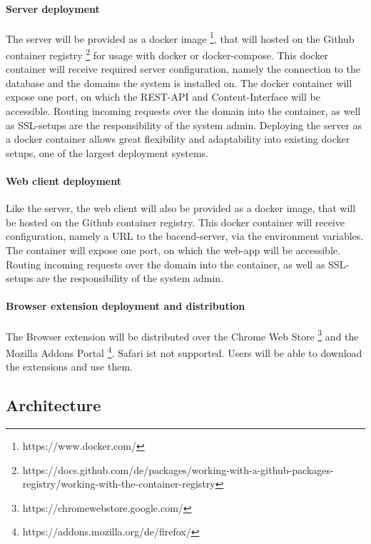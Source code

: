 \paragraph{Server deployment}
The server will be provided as a docker image \footnote{https://www.docker.com/}, that will hosted on the Github container registry \footnote{https://docs.github.com/de/packages/working-with-a-github-packages-registry/working-with-the-container-registry} for usage with docker or docker-compose.
This docker container will receive required server configuration, namely the connection to the database and the domains the system is installed on.
The docker container will expose one port, on which the REST-API and Content-Interface will be accessible.
Routing incoming requests over the domain into the container, as well as SSL-setups are the responsibility of the system admin. \newline
Deploying the server as a docker container allows great flexibility and adaptability into existing docker setups, one of the largest deployment systems.

\paragraph{Web client deployment}
Like the server, the web client will also be provided as a docker image, that will be hosted on the Github container registry.
This docker container will receive configuration, namely a URL to the bacend-server, via the environment variables.
The container will expose one port, on which the web-app will be accessible.
Routing incoming requests over the domain into the container, as well as SSL-setups are the responsibility of the system admin. \newline

\paragraph{Browser extension deployment and distribution}
The Browser extension will be distributed over the Chrome Web Store \footnote{https://chromewebstore.google.com/} and the Mozilla Addons Portal \footnote{https://addons.mozilla.org/de/firefox/}.
Safari ist not supported.
Users will be able to download the extensions and use them.

\subsection{Architecture}\label{subsec:architecture}


